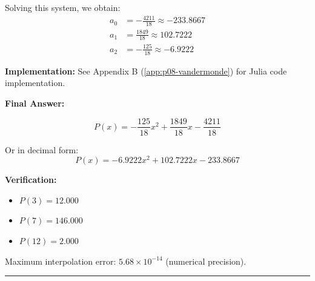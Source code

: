 Solving this system, we obtain:
\begin{align*}
a_0 &= -\frac{4211}{18} \approx -233.8667 \\
a_1 &= \frac{1849}{18} \approx 102.7222 \\
a_2 &= -\frac{125}{18} \approx -6.9222
\end{align*}

\textbf{Implementation:} See Appendix B (\ref{app:p08-vandermonde}) for Julia code implementation.

\textbf{Final Answer:}

$$\boxed{P(x) = -\frac{125}{18}x^2 + \frac{1849}{18}x - \frac{4211}{18}}$$

Or in decimal form:
$$\boxed{P(x) = -6.9222x^2 + 102.7222x - 233.8667}$$

\textbf{Verification:}
\begin{itemize}
    \item $P(3) = 12.000$
    \item $P(7) = 146.000$
    \item $P(12) = 2.000$
\end{itemize}

Maximum interpolation error: $5.68 \times 10^{-14}$ (numerical precision).

\vspace{2em}
\noindent\rule{\textwidth}{0.4pt}
